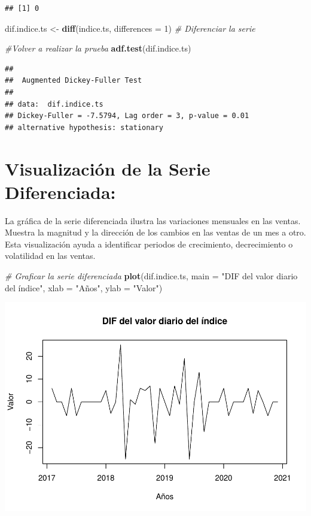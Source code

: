 \documentclass[
]{book}
\newenvironment{Shaded}{\begin{snugshade}}{\end{snugshade}}
\newcommand{\AttributeTok}[1]{\textcolor[rgb]{0.13,0.29,0.53}{#1}}
\newcommand{\CommentTok}[1]{\textcolor[rgb]{0.56,0.35,0.01}{\textit{#1}}}
\newcommand{\DecValTok}[1]{\textcolor[rgb]{0.00,0.00,0.81}{#1}}
\newcommand{\FunctionTok}[1]{\textcolor[rgb]{0.13,0.29,0.53}{\textbf{#1}}}
\newcommand{\NormalTok}[1]{#1}
\newcommand{\OtherTok}[1]{\textcolor[rgb]{0.56,0.35,0.01}{#1}}
\newcommand{\StringTok}[1]{\textcolor[rgb]{0.31,0.60,0.02}{#1}}
\begin{document}
\begin{verbatim}
## [1] 0
\end{verbatim}

\begin{Shaded}
\begin{Highlighting}[]
\NormalTok{dif.indice.ts }\OtherTok{\textless{}{-}} \FunctionTok{diff}\NormalTok{(indice.ts, }\AttributeTok{differences =} \DecValTok{1}\NormalTok{) }\CommentTok{\# Diferenciar la serie}


\CommentTok{\#Volver a realizar la prueba}
\FunctionTok{adf.test}\NormalTok{(dif.indice.ts)}
\end{Highlighting}
\end{Shaded}

\begin{verbatim}
## 
##  Augmented Dickey-Fuller Test
## 
## data:  dif.indice.ts
## Dickey-Fuller = -7.5794, Lag order = 3, p-value = 0.01
## alternative hypothesis: stationary
\end{verbatim}

\section{Visualización de la Serie Diferenciada:}\label{visualizaciuxf3n-de-la-serie-diferenciada}

La gráfica de la serie diferenciada ilustra las variaciones mensuales en las ventas. Muestra la magnitud y la dirección de los cambios en las ventas de un mes a otro. Esta visualización ayuda a identificar periodos de crecimiento, decrecimiento o volatilidad en las ventas.

\begin{Shaded}
\begin{Highlighting}[]
\CommentTok{\# Graficar la serie diferenciada}
\FunctionTok{plot}\NormalTok{(dif.indice.ts,  }\AttributeTok{main =} \StringTok{"DIF del valor diario del índice"}\NormalTok{, }\AttributeTok{xlab =} \StringTok{"Años"}\NormalTok{, }\AttributeTok{ylab =} \StringTok{"Valor"}\NormalTok{)}
\end{Highlighting}
\end{Shaded}

\includegraphics{_main_files/figure-latex/unnamed-chunk-15-1.pdf}
\end{document}
